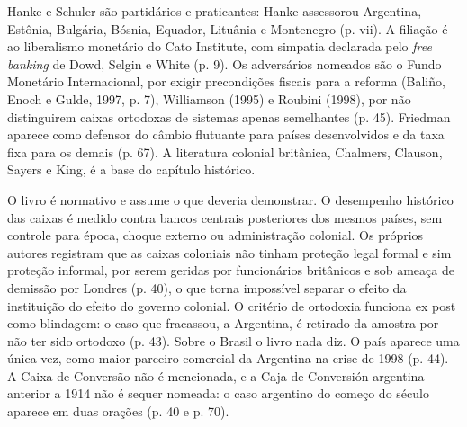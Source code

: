Hanke e Schuler são partidários e praticantes: Hanke assessorou Argentina,
Estônia, Bulgária, Bósnia, Equador, Lituânia e Montenegro (p. vii). A filiação
é ao liberalismo monetário do Cato Institute, com simpatia declarada pelo
\emph{free banking} de Dowd, Selgin e White (p. 9). Os adversários nomeados são
o Fundo Monetário Internacional, por exigir precondições fiscais para a reforma
(Baliño, Enoch e Gulde, 1997, p. 7), Williamson (1995) e Roubini (1998), por
não distinguirem caixas ortodoxas de sistemas apenas semelhantes (p. 45).
Friedman aparece como defensor do câmbio flutuante para países desenvolvidos e
da taxa fixa para os demais (p. 67). A literatura colonial britânica, Chalmers,
Clauson, Sayers e King, é a base do capítulo histórico.

O livro é normativo e assume o que deveria demonstrar. O desempenho histórico
das caixas é medido contra bancos centrais posteriores dos mesmos países, sem
controle para época, choque externo ou administração colonial. Os próprios
autores registram que as caixas coloniais não tinham proteção legal formal e
sim proteção informal, por serem geridas por funcionários britânicos e sob
ameaça de demissão por Londres (p. 40), o que torna impossível separar o
efeito da instituição do efeito do governo colonial. O critério de ortodoxia
funciona ex post como blindagem: o caso que fracassou, a Argentina, é retirado
da amostra por não ter sido ortodoxo (p. 43). Sobre o Brasil o livro nada diz.
O país aparece uma única vez, como maior parceiro comercial da Argentina na
crise de 1998 (p. 44). A Caixa de Conversão não é mencionada, e a Caja de
Conversión argentina anterior a 1914 não é sequer nomeada: o caso argentino do
começo do século aparece em duas orações (p. 40 e p. 70).

